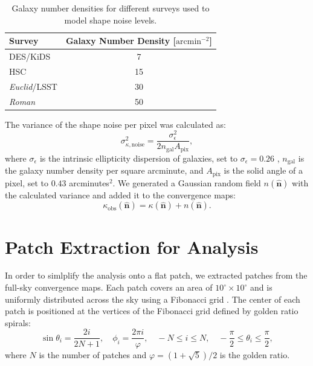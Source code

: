 \begin{table}[h]
\centering
\begin{tabular}{lc}
\toprule
\textbf{Survey} & \textbf{Galaxy Number Density} [$\mathrm{arcmin}^{-2}$] \\
\midrule
DES/KiDS & 7 \\
HSC & 15 \\
\textit{Euclid}/LSST & 30 \\
\textit{Roman} & 50 \\
\bottomrule
\end{tabular}
\caption{Galaxy number densities for different surveys used to model shape noise levels.}\label{tab:noise}
\end{table}

The variance of the shape noise per pixel was calculated as:
\begin{equation}
    \sigma_{\kappa, \text{noise}}^2 = \frac{\sigma_{\epsilon}^2}{2 n_{\mathrm{gal}} A_{\mathrm{pix}}},
\end{equation}
where $\sigma_{\epsilon}$ is the intrinsic ellipticity dispersion of galaxies, set to $\sigma_{\epsilon} = 0.26$ \citep{2019A&A...627A..59E}, $n_{\mathrm{gal}}$ is the galaxy number density per square arcminute, and $A_{\mathrm{pix}}$ is the solid angle of a pixel, set to $0.43$ arcminutes$^2$.
We generated a Gaussian random field $n(\hat{\mathbf{n}})$ with the calculated variance and added it to the convergence maps:
\begin{equation}
    \kappa_{\mathrm{obs}}(\hat{\mathbf{n}}) = \kappa(\hat{\mathbf{n}}) + n(\hat{\mathbf{n}}).
\end{equation}

\section{Patch Extraction for Analysis}
In order to simlplify the analysis onto a flat patch, we extracted patches from the full-sky convergence maps. Each patch covers an area of $10^\circ \times 10^\circ$ and is uniformly distributed across the sky using a Fibonacci grid \citep{2006QJRMS.132.1769S, 2023MNRAS.524.5591F}. The center of each patch is positioned at the vertices of the Fibonacci grid defined by golden ratio spirals:
\begin{equation}
    \sin \theta_i = \frac{2i}{2N + 1}, \quad \phi_i = \frac{2 \pi i}{\varphi}, \quad -N \leq i \leq N, \quad -\frac{\pi}{2} \leq \theta_i \leq \frac{\pi}{2},
\end{equation}
where $N$ is the number of patches and $\varphi = (1 + \sqrt{5})/2$ is the golden ratio.

